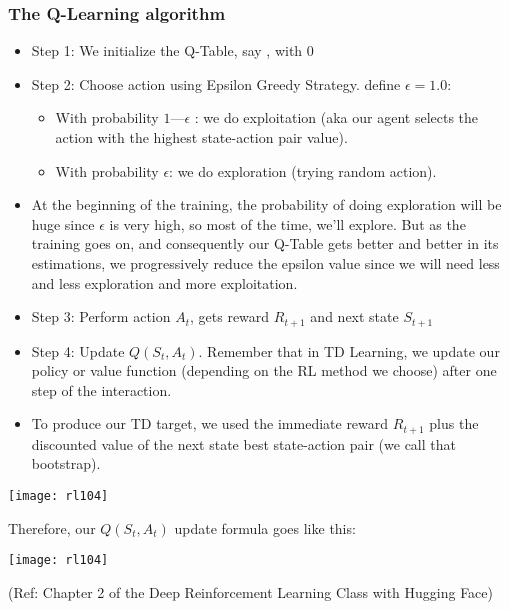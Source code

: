 \begin{frame}[fragile]\frametitle{The Q-Learning algorithm}

\begin{itemize}
\item Step 1: We initialize the Q-Table, say , with 0
\item Step 2: Choose action using Epsilon Greedy Strategy.  define $\epsilon = 1.0$:
\begin{itemize}
\item With probability $1 — \epsilon$ : we do exploitation (aka our agent selects the action with the highest state-action pair value).
\item With probability $\epsilon$: we do exploration (trying random action). 
\end{itemize}
\item At the beginning of the training, the probability of doing exploration will be huge since $\epsilon$ is very high, so most of the time, we'll explore. But as the training goes on, and consequently our Q-Table gets better and better in its estimations, we progressively reduce the epsilon value since we will need less and less exploration and more exploitation.
\item Step 3: Perform action $A_t$, gets reward $R_{t+1}$ and next state $S_{t+1}$
\item Step 4: Update $Q(S_t, A_t)$. Remember that in TD Learning, we update our policy or value function (depending on the RL method we choose) after one step of the interaction.
\item To produce our TD target, we used the immediate reward $R_{t+1}$ plus the discounted value of the next state best state-action pair (we call that bootstrap).

\end{itemize}


\begin{center}
\texttt{[image: rl104]}
\end{center}

Therefore, our $Q(S_t, A_t)$ update formula goes like this:

\begin{center}
\texttt{[image: rl104]}
\end{center}

 
{\tiny (Ref: Chapter 2 of the Deep Reinforcement Learning Class with Hugging Face)}

\end{frame}

